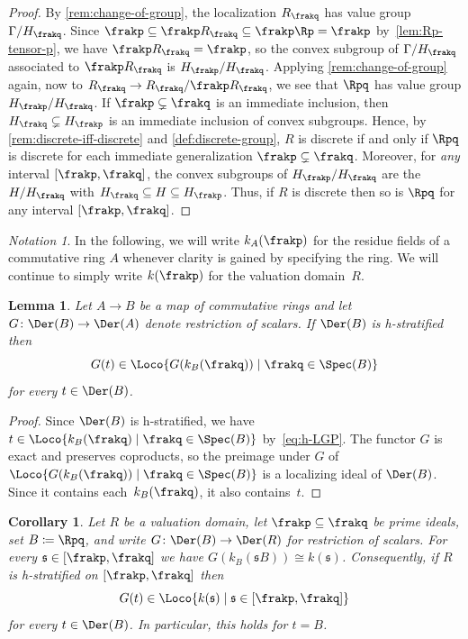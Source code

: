 \documentclass{amsart}
\numberwithin{equation}{section}%
\newtheorem{Lem}[equation]{Lemma}
\newtheorem{Cor}[equation]{Corollary}
\theoremstyle{remark}
\newtheorem{Not}[equation]{Notation}
\begin{document}
\begin{proof}
	By \cref{rem:change-of-group}, the localization $R_\frakq$ has value group $\Gamma/H_\frakq$. Since $\frakp \subseteq \frakp R_\frakq \subseteq \frakp\Rp = \frakp$ by~\cref{lem:Rp-tensor-p}, we have $\frakp R_\frakq = \frakp$, so the convex subgroup of $\Gamma/H_\frakq$ associated to $\frakp R_\frakq$ is $H_\frakp/H_\frakq$. Applying \cref{rem:change-of-group} again, now to $R_\frakq \to R_\frakq/\frakp R_\frakq$, we see that $\Rpq$ has value group $H_\frakp/H_\frakq$. If $\frakp \subsetneq \frakq$ is an immediate inclusion, then $H_\frakq \subsetneq H_\frakp$ is an immediate inclusion of convex subgroups. Hence, by \cref{rem:discrete-iff-discrete} and \cref{def:discrete-group}, $R$ is discrete if and only if $\Rpq$ is discrete for each immediate generalization $\frakp \subsetneq \frakq$.  Moreover, for \emph{any} interval $[\frakp,\frakq]$, the convex subgroups of $H_\frakp/H_\frakq$ are the $H/H_\frakq$ with $H_\frakq \subseteq H \subseteq H_\frakp$. Thus, if $R$ is discrete then so is $\Rpq$ for any interval $[\frakp,\frakq]$.
\end{proof}

\begin{Not}
	In the following, we will write $k_A(\frakp)$ for the residue fields of a commutative ring $A$ whenever clarity is gained by specifying the ring. We will continue to simply write $k(\frakp)$ for the valuation domain~$R$.
\end{Not}

\begin{Lem}\label{lem:h-strat-restrict}
	Let $A \to B$ be a map of commutative rings and let $G\colon \Der(B) \to \Der(A)$ denote restriction of scalars. If $\Der(B)$ is h-stratified then 
	\[
		G(t) \in \Loco{G(k_B(\frakq)) \mid \frakq \in \Spec(B)}
	\]
	for every $t \in \Der(B)$.
\end{Lem}

\begin{proof}
	Since $\Der(B)$ is h-stratified, we have $t \in \Loco{k_B(\frakq) \mid \frakq \in \Spec(B)}$ by~\eqref{eq:h-LGP}.  The functor $G$ is exact and preserves coproducts, so the preimage under $G$ of $\Loco{G(k_B(\frakq)) \mid \frakq \in \Spec(B)}$ is a localizing ideal of $\Der(B)$. Since it contains each~$k_B(\frakq)$, it also contains~$t$. 
\end{proof}

\begin{Cor}\label{cor:h-strat-interval}
	Let $R$ be a valuation domain, let $\frakp \subseteq \frakq$ be prime ideals, set $B \coloneqq \Rpq$, and write $G\colon \Der(B) \to \Der(R)$ for restriction of scalars. For every $\mathfrak{s} \in [\frakp,\frakq]$ we have $G(k_B(\mathfrak{s}B)) \cong k(\mathfrak{s})$. Consequently, if $R$ is h-stratified on $[\frakp,\frakq]$ then \[ G(t) \in \Loco{k(\mathfrak{s}) \mid \mathfrak{s} \in [\frakp,\frakq]} \] for every $t \in \Der(B)$. In particular, this holds for $t = B$.
\end{Cor}
\end{document}
